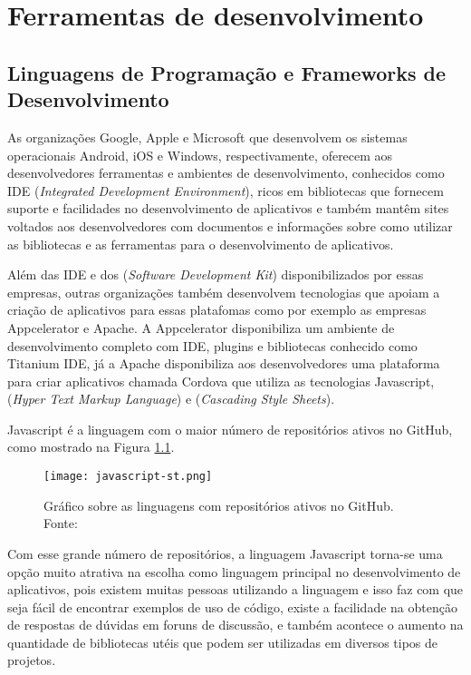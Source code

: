 \chapter{Ferramentas de desenvolvimento}\label{cha:ferramentas}

\section{Linguagens de Programação e Frameworks de Desenvolvimento}
As organizações Google, Apple e Microsoft que desenvolvem os sistemas operacionais Android, iOS e Windows, respectivamente, oferecem aos desenvolvedores ferramentas e ambientes de desenvolvimento, conhecidos como IDE (\textit{Integrated Development Environment}), ricos em bibliotecas que fornecem suporte e facilidades no desenvolvimento de aplicativos e também mantêm sites voltados aos desenvolvedores com documentos e informações sobre como utilizar as bibliotecas e as ferramentas para o desenvolvimento de aplicativos.

Além das IDE e dos  (\textit{Software Development Kit}) disponibilizados por essas empresas, outras organizações também desenvolvem tecnologias que apoiam a criação de aplicativos para essas platafomas como por exemplo as empresas Appcelerator e Apache. A Appcelerator disponibiliza um ambiente de desenvolvimento completo com IDE, plugins e bibliotecas conhecido como Titanium IDE, já a Apache disponibiliza aos desenvolvedores uma plataforma para criar aplicativos chamada Cordova que utiliza as tecnologias Javascript,  (\textit{Hyper Text Markup Language}) e  (\textit{Cascading Style Sheets}).

Javascript é a linguagem com o maior número de repositórios ativos no GitHub, como mostrado na Figura \ref{fig:javascript}.

\begin{figure}[!htb]
	\centering
	\texttt{[image: javascript-st.png]} %
	\caption[Linguagens com maior número de repositórios ativos no GitHub]{Gráfico sobre as linguagens com repositórios ativos no GitHub. Fonte: \cite{githut}}
	\label{fig:javascript}
\end{figure}
\vspace{-3mm}

Com esse grande número de repositórios, a linguagem Javascript torna-se uma opção muito atrativa na escolha como linguagem principal no desenvolvimento de aplicativos, pois existem muitas pessoas utilizando a linguagem e isso faz com que seja fácil de encontrar exemplos de uso de código, existe a facilidade na obtenção de respostas de dúvidas em foruns de discussão, e também acontece o aumento na quantidade de bibliotecas utéis que podem ser utilizadas em diversos tipos de projetos.

